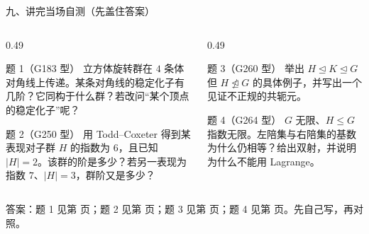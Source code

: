 \documentclass[aspectratio=169,10pt,fontset=none]{ctexbeamer}
\begin{document}
\begin{frame}[t]{九、讲完当场自测（先盖住答案）}
  \label{sec:selftest}
  \begin{columns}[T,onlytextwidth]
    \begin{column}{0.49\textwidth}
      \begin{exampleblock}{\footnotesize 题 1（G183 型）}
        \scriptsize
        立方体旋转群在 $4$ 条体对角线上传递。某条对角线的稳定化子有几阶？它同构于什么群？若改问“某个顶点的稳定化子”呢？
      \end{exampleblock}
      \begin{exampleblock}{\footnotesize 题 2（G250 型）}
        \scriptsize
        用 Todd--Coxeter 得到某表现对子群 $H$ 的指数为 $6$，且已知 $|H|=2$。该群的阶是多少？若另一表现为指数 $7$、$|H|=3$，群阶又是多少？
      \end{exampleblock}
    \end{column}
    \begin{column}{0.49\textwidth}
      \begin{exampleblock}{\footnotesize 题 3（G260 型）}
        \scriptsize
        举出 $H\trianglelefteq K\trianglelefteq G$ 但 $H\not\trianglelefteq G$ 的具体例子，并写出一个见证不正规的共轭元。
      \end{exampleblock}
      \begin{exampleblock}{\footnotesize 题 4（G264 型）}
        \scriptsize
        $G$ 无限、$H\le G$ 指数无限。左陪集与右陪集的基数为什么仍相等？给出双射，并说明为什么不能用 Lagrange。
      \end{exampleblock}
    \end{column}
  \end{columns}
  \vspace{0.3em}
  {\scriptsize\color{ink!70} 答案：题 1 见第 \pageref{ex:G183} 页；题 2 见第 \pageref{ex:G250} 页；题 3 见第 \pageref{ex:G260} 页；题 4 见第 \pageref{ex:G264} 页。先自己写，再对照。}
\end{frame}
\end{document}
